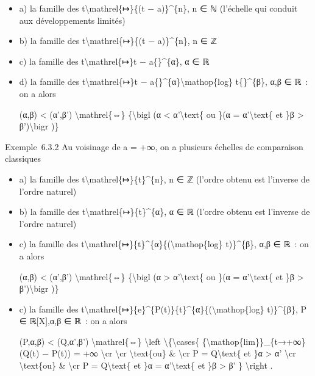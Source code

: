 \documentclass[]{article}
\begin{document}
\begin{itemize}
\item
  a) la famille des t\textbackslash{}mathrel\{↦\}\{(t − a)\}\^{}\{n\}, n
  ∈ ℕ (l'échelle qui conduit aux développements limités)
\item
  b) la famille des t\textbackslash{}mathrel\{↦\}\{(t − a)\}\^{}\{n\}, n
  ∈ ℤ
\item
  c) la famille des t\textbackslash{}mathrel\{↦\}\textbar{}t −
  a\{\textbar{}\}\^{}\{α\}, α ∈ ℝ
\item
  d) la famille des t\textbackslash{}mathrel\{↦\}\textbar{}t −
  a\{\textbar{}\}\^{}\{α\}\textbar{}\textbackslash{}mathop\{log\}
  t\{\textbar{}\}\^{}\{β\}, α,β ∈ ℝ~: on a alors

  (α,β) \textless{} (α',β') \textbackslash{}mathrel\{⇔\}
  \{\textbackslash{}bigl (α \textless{} α'\textbackslash{}text\{ ou \}(α
  = α'\textbackslash{}text\{ et \}β \textgreater{}
  β')\textbackslash{}bigr )\}
\end{itemize}

Exemple~6.3.2 Au voisinage de a = +∞, on a plusieurs échelles de
comparaison classiques

\begin{itemize}
\item
  a) la famille des t\textbackslash{}mathrel\{↦\}\{t\}\^{}\{n\}, n ∈ ℤ
  (l'ordre obtenu est l'inverse de l'ordre naturel)
\item
  b) la famille des t\textbackslash{}mathrel\{↦\}\{t\}\^{}\{α\}, α ∈ ℝ
  (l'ordre obtenu est l'inverse de l'ordre naturel)
\item
  c) la famille des
  t\textbackslash{}mathrel\{↦\}\{t\}\^{}\{α\}\{(\textbackslash{}mathop\{log\}
  t)\}\^{}\{β\}, α,β ∈ ℝ~: on a alors

  (α,β) \textless{} (α',β') \textbackslash{}mathrel\{⇔\}
  \{\textbackslash{}bigl (α \textgreater{} α'\textbackslash{}text\{ ou
  \}(α = α'\textbackslash{}text\{ et \}β \textgreater{}
  β')\textbackslash{}bigr )\}
\item
  c) la famille des
  t\textbackslash{}mathrel\{↦\}\{e\}\^{}\{P(t)\}\{t\}\^{}\{α\}\{(\textbackslash{}mathop\{log\}
  t)\}\^{}\{β\}, P ∈ ℝ{[}X{]},α,β ∈ ℝ~: on a alors

  (P,α,β) \textless{} (Q,α',β') \textbackslash{}mathrel\{⇔\}
  \textbackslash{}left \textbackslash{}\{\textbackslash{}cases\{
  \{\textbackslash{}mathop\{lim\}\}\_\{t→+∞\}(Q(t) − P(t)) = +∞
  \textbackslash{}cr \textbackslash{}cr \textbackslash{}text\{ou\} \&
  \textbackslash{}cr P = Q\textbackslash{}text\{ et \}α \textgreater{}
  α' \textbackslash{}cr \textbackslash{}text\{ou\} \& \textbackslash{}cr
  P = Q\textbackslash{}text\{ et \}α = α'\textbackslash{}text\{ et \}β
  \textgreater{} β' \} \textbackslash{}right .
\end{itemize}
\end{document}
